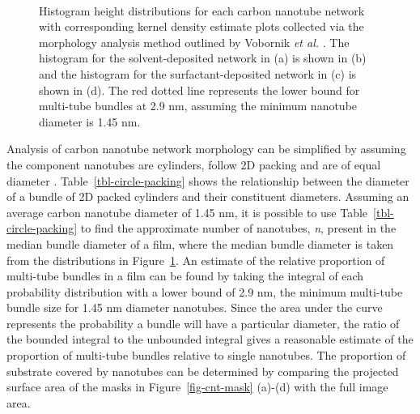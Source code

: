 \documentclass[
  a4paper,
]{scrbook}
\begin{document}
\begin{figure}
\begin{minipage}[t]{0.45\linewidth}
\end{minipage}%
%
\begin{minipage}[t]{0.01\linewidth}

{\centering 

~

}

\end{minipage}%

\caption[Histogram height distributions for each carbon nanotube network
with corresponding kernel density estimate
plots.]{\label{fig-cnt-histogram}Histogram height distributions for each
carbon nanotube network with corresponding kernel density estimate plots
collected via the morphology analysis method outlined by Vobornik
\emph{et al.} \autocite{Vobornik2023}. The histogram for the
solvent-deposited network in (a) is shown in (b) and the histogram for
the surfactant-deposited network in (c) is shown in (d). The red dotted
line represents the lower bound for multi-tube bundles at 2.9 nm,
assuming the minimum nanotube diameter is 1.45 nm.}

\end{figure}

Analysis of carbon nanotube network morphology can be simplified by
assuming the component nanotubes are cylinders, follow 2D packing and
are of equal diameter \autocite{Murugathas2018}.
Table~\ref{tbl-circle-packing} shows the relationship between the
diameter of a bundle of 2D packed cylinders and their constituent
diameters. Assuming an average carbon nanotube diameter of 1.45 nm, it
is possible to use Table~\ref{tbl-circle-packing} to find the
approximate number of nanotubes, \emph{n}, present in the median bundle
diameter of a film, where the median bundle diameter is taken from the
distributions in Figure~\ref{fig-cnt-histogram}. An estimate of the
relative proportion of multi-tube bundles in a film can be found by
taking the integral of each probability distribution with a lower bound
of 2.9 nm, the minimum multi-tube bundle size for 1.45 nm diameter
nanotubes. Since the area under the curve represents the probability a
bundle will have a particular diameter, the ratio of the bounded
integral to the unbounded integral gives a reasonable estimate of the
proportion of multi-tube bundles relative to single nanotubes. The
proportion of substrate covered by nanotubes can be determined by
comparing the projected surface area of the masks in
Figure~\ref{fig-cnt-mask} (a)-(d) with the full image area.
\end{document}
